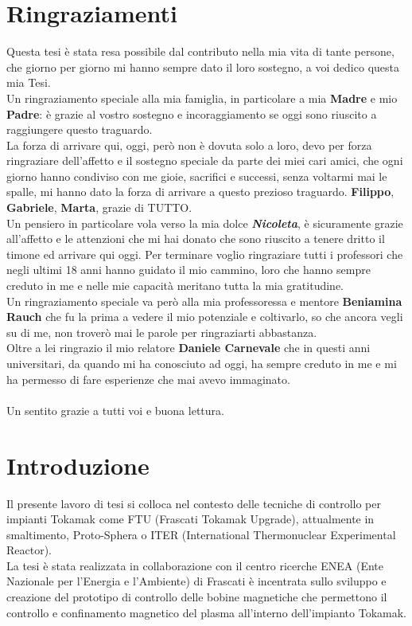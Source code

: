 \chapter*{Ringraziamenti}
\vspace{-8mm}
Questa tesi è stata resa possibile dal contributo nella mia vita di tante persone, che giorno per giorno mi hanno sempre dato il loro sostegno, a voi dedico questa mia Tesi.\\
Un ringraziamento speciale alla mia famiglia, in particolare a mia \textbf{Madre} e mio \textbf{Padre}: è grazie al vostro sostegno e incoraggiamento se oggi sono riuscito a raggiungere questo traguardo.\\
La forza di arrivare qui, oggi, però non è dovuta solo a loro, devo per forza ringraziare dell'affetto e il sostegno speciale da parte dei miei cari amici, che ogni giorno hanno condiviso con me gioie, sacrifici e successi, senza voltarmi mai le spalle, mi hanno dato la forza di arrivare a questo prezioso traguardo. \textbf{Filippo}, \textbf{Gabriele}, \textbf{Marta}, grazie di TUTTO.\\
Un pensiero in particolare vola verso la mia dolce \textbf{\textit{Nicoleta}}, è sicuramente grazie all'affetto e le attenzioni che mi hai donato che sono riuscito a tenere dritto il timone ed arrivare qui oggi.
Per terminare voglio ringraziare tutti i professori che negli ultimi 18 anni hanno guidato il mio cammino, loro che hanno sempre creduto in me e nelle mie capacità meritano tutta la mia gratitudine.\\
Un ringraziamento speciale va però alla mia professoressa e mentore \textbf{Beniamina Rauch} che fu la prima a vedere il mio potenziale e coltivarlo, so che ancora vegli su di me, non troverò mai le parole per ringraziarti abbastanza.\\
Oltre a lei ringrazio il mio relatore \textbf{Daniele Carnevale} che in questi anni universitari, da quando mi ha conosciuto ad oggi, ha sempre creduto in me e mi ha permesso di fare esperienze che mai avevo immaginato.\\ \\
Un sentito grazie a tutti voi e buona lettura.


\chapter*{Introduzione}
Il presente lavoro di tesi si colloca nel contesto delle tecniche di controllo per impianti Tokamak come
FTU (Frascati Tokamak Upgrade), attualmente in smaltimento, Proto-Sphera o ITER (International Thermonuclear Experimental Reactor).\\
La tesi è stata realizzata in collaborazione con il centro ricerche ENEA (Ente Nazionale per l’Energia e l’Ambiente) di Frascati è incentrata sullo sviluppo e creazione del prototipo di controllo delle bobine magnetiche che permettono il controllo e confinamento magnetico del plasma all'interno dell'impianto Tokamak.

